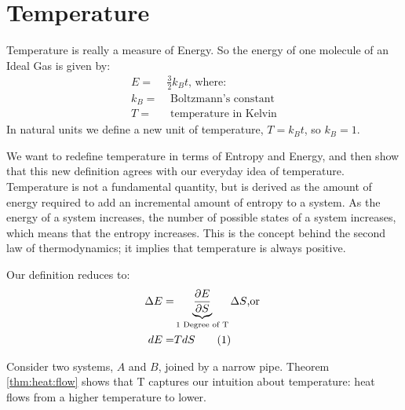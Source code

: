 \documentclass[]{article}
\newcommand\numberthis{\addtocounter{equation}{1}\tag{\theequation}}
\begin{document}
\section{Temperature}


Temperature is really a measure of Energy. So the energy of one molecule of an Ideal Gas is given by:
\begin{align*}
E =& \frac{3}{2} k_B t\text{, where:}\\
k_B =& \text{ Boltzmann's constant}\\
T =& \text{ temperature in Kelvin}
\end{align*}
 In natural units we define a new unit of temperature, $T=k_Bt$, so $k_B=1$.
 
 We want to redefine temperature in terms of Entropy and Energy, and then show that this new definition agrees with our everyday idea of temperature. Temperature is not a fundamental quantity, but is derived as the amount of energy required to add an incremental amount of entropy to a system.  As the energy of a system increases, the number of possible states of a system increases, which means that the entropy increases.  This is the concept behind the second law of thermodynamics; it implies that temperature is always positive.
 
 Our definition reduces to:
\begin{align*}
\Delta E =& \underbrace{\frac{\partial E}{\partial S}}_\text{1 Degree of T} \Delta S\text{,or }\\
dE =& T dS \numberthis \label{eq:T}
\end{align*}

Consider two systems, $A$ and $B$, joined by a narrow pipe. Theorem \ref{thm:heat:flow} shows that T captures our intuition about temperature: heat flows from a higher temperature to lower.
\end{document}
